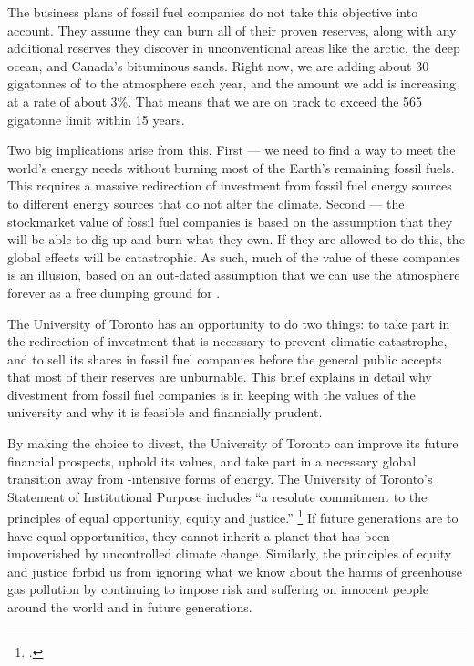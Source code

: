 The business plans of fossil fuel companies do not take this objective into account.
They assume they can burn all of their proven reserves, along with any additional reserves they discover in unconventional areas like the arctic, the deep ocean, and Canada's bituminous sands.
Right now, we are adding about 30 gigatonnes of  to the atmosphere each year, and the amount we add is increasing at a rate of about 3\%.
That means that we are on track to exceed the 565 gigatonne limit within 15 years.



Two big implications arise from this. 
First --- we need to find a way to meet the world's energy needs without burning most of the Earth's remaining fossil fuels. 
This requires a massive redirection of investment from fossil fuel energy sources to different energy sources that do not alter the climate.
Second --- the stockmarket value of fossil fuel companies is based on the assumption that they will be able to dig up and burn what they own.
If they are allowed to do this, the global effects will be catastrophic.
As such, much of the value of these companies is an illusion, based on an out-dated assumption that we can use the atmosphere forever as a free dumping ground for .



The University of Toronto has an opportunity to do two things: to take part in the redirection of investment that is necessary to prevent climatic catastrophe, and to sell its shares in fossil fuel companies before the general public accepts that most of their reserves are unburnable.
This brief explains in detail why divestment from fossil fuel companies is in keeping with the values of the university and why it is feasible and financially prudent.



By making the choice to divest, the University of Toronto can improve its future financial prospects, uphold its values, and take part in a necessary global transition away from -intensive forms of energy.
The University of Toronto's Statement of Institutional Purpose includes ``a resolute commitment to the principles of equal opportunity, equity and justice.'' \footcite{InstitutionalPurpose}
If future generations are to have equal opportunities, they cannot inherit a planet that has been impoverished by uncontrolled climate change.
Similarly, the principles of equity and justice forbid us from ignoring what we know about the harms of greenhouse gas pollution by continuing to impose risk and suffering on innocent people around the world and in future generations.




